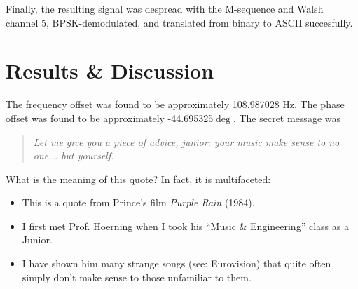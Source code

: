 \documentclass[journal]{IEEEtran}
\begin{document}
Finally, the resulting signal was despread with the M-sequence and Walsh channel 5, BPSK-demodulated, and translated from binary to ASCII succesfully.

\section{Results \& Discussion}
The frequency offset was found to be approximately 108.987028 Hz. The phase offset was found to be approximately -44.695325$\deg$. The secret message was  
\begin{quote}
\emph{Let me give you a piece of advice, junior: your music make sense to no one... but yourself.}
\end{quote}

What is the meaning of this quote? In fact, it is multifaceted:
\begin{itemize}
\item This is a quote from Prince's film \emph{Purple Rain} (1984).
\item I first met Prof. Hoerning when I took his ``Music \& Engineering'' class as a Junior.
\item I have shown him many strange songs (see: Eurovision) that quite often simply don't make sense to those unfamiliar to them.
\end{itemize}


\end{document}
